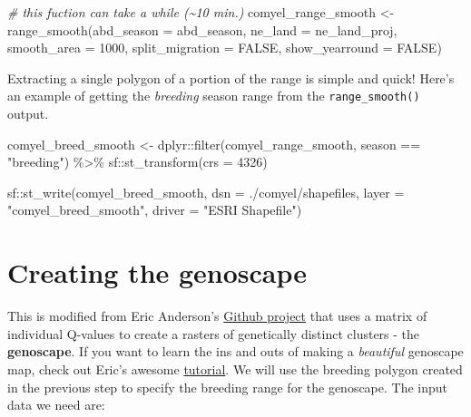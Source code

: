 \documentclass[
]{book}
\newenvironment{Shaded}{\begin{snugshade}}{\end{snugshade}}
\newcommand{\AttributeTok}[1]{\textcolor[rgb]{0.77,0.63,0.00}{#1}}
\newcommand{\CommentTok}[1]{\textcolor[rgb]{0.56,0.35,0.01}{\textit{#1}}}
\newcommand{\ConstantTok}[1]{\textcolor[rgb]{0.00,0.00,0.00}{#1}}
\newcommand{\DecValTok}[1]{\textcolor[rgb]{0.00,0.00,0.81}{#1}}
\newcommand{\FunctionTok}[1]{\textcolor[rgb]{0.00,0.00,0.00}{#1}}
\newcommand{\NormalTok}[1]{#1}
\newcommand{\OtherTok}[1]{\textcolor[rgb]{0.56,0.35,0.01}{#1}}
\newcommand{\SpecialCharTok}[1]{\textcolor[rgb]{0.00,0.00,0.00}{#1}}
\newcommand{\StringTok}[1]{\textcolor[rgb]{0.31,0.60,0.02}{#1}}
\begin{document}
\begin{Shaded}
\begin{Highlighting}[]
\CommentTok{\# this fuction can take a while (\textasciitilde{}10 min.)}
\NormalTok{comyel\_range\_smooth }\OtherTok{\textless{}{-}} \FunctionTok{range\_smooth}\NormalTok{(}\AttributeTok{abd\_season =}\NormalTok{ abd\_season, }
                                  \AttributeTok{ne\_land =}\NormalTok{ ne\_land\_proj,}
                                  \AttributeTok{smooth\_area =} \DecValTok{1000}\NormalTok{,}
                                  \AttributeTok{split\_migration =} \ConstantTok{FALSE}\NormalTok{, }
                                  \AttributeTok{show\_yearround =} \ConstantTok{FALSE}\NormalTok{)}
\end{Highlighting}
\end{Shaded}

Extracting a single polygon of a portion of the range is simple and quick! Here's an example of getting the \emph{breeding} season range from the \texttt{range\_smooth()} output.

\begin{Shaded}
\begin{Highlighting}[]
\NormalTok{comyel\_breed\_smooth }\OtherTok{\textless{}{-}}\NormalTok{ dplyr}\SpecialCharTok{::}\FunctionTok{filter}\NormalTok{(comyel\_range\_smooth,}
\NormalTok{                                season }\SpecialCharTok{==} \StringTok{"breeding"}\NormalTok{) }\SpecialCharTok{\%\textgreater{}\%}
\NormalTok{                    sf}\SpecialCharTok{::}\FunctionTok{st\_transform}\NormalTok{(}\AttributeTok{crs =} \DecValTok{4326}\NormalTok{)}

\NormalTok{sf}\SpecialCharTok{::}\FunctionTok{st\_write}\NormalTok{(comyel\_breed\_smooth, }\AttributeTok{dsn =} \StringTok{\textquotesingle{}./comyel/shapefiles\textquotesingle{}}\NormalTok{,}
          \AttributeTok{layer =} \StringTok{"comyel\_breed\_smooth"}\NormalTok{,}
          \AttributeTok{driver =} \StringTok{"ESRI Shapefile"}\NormalTok{)}
\end{Highlighting}
\end{Shaded}

\hypertarget{creating-the-genoscape}{%
\section{Creating the genoscape}\label{creating-the-genoscape}}

This is modified from Eric Anderson's \href{https://github.com/eriqande/make-a-BGP-map}{Github project} that uses a matrix of individual Q-values to create a rasters of genetically distinct clusters - the \textbf{genoscape}. If you want to learn the ins and outs of making a \emph{beautiful} genoscape map, check out Eric's awesome \href{https://github.com/eriqande/make-a-BGP-map}{tutorial}. We will use the breeding polygon created in the previous step to specify the breeding range for the genoscape. The input data we need are:
\end{document}
